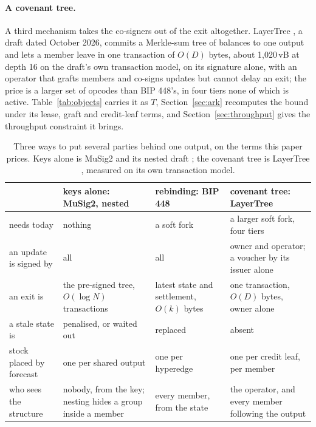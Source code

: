 \documentclass[11pt]{article}
\theoremstyle{plain}
\theoremstyle{definition}
\theoremstyle{remark}
\begin{document}
\paragraph{A covenant tree.} A third mechanism takes the co-signers out of the exit altogether. LayerTree \citep{osuntokun2026layertree}, a draft dated October 2026, commits a Merkle-sum tree of balances to one output and lets a member leave in one transaction of $O(D)$ bytes, about 1{,}020\,vB at depth 16 on the draft's own transaction model, on its signature alone, with an operator that grafts members and co-signs updates but cannot delay an exit; the price is a larger set of opcodes than BIP 448's, in four tiers none of which is active. Table~\ref{tab:objects} carries it as $T$, Section~\ref{sec:ark} recomputes the bound under its lease, graft and credit-leaf terms, and Section~\ref{sec:throughput} gives the throughput constraint it brings.

\begin{table}[t]
\centering
\footnotesize
\setlength{\tabcolsep}{4pt}
\begin{tabular}{@{}>{\raggedright\arraybackslash}p{2.9cm}>{\raggedright\arraybackslash}p{3.6cm}>{\raggedright\arraybackslash}p{3.4cm}>{\raggedright\arraybackslash}p{3.7cm}@{}}
\toprule
 & keys alone: MuSig2, nested & rebinding: BIP 448 & covenant tree: LayerTree \\
\midrule
needs today & nothing & a soft fork & a larger soft fork, four tiers \\
an update is signed by & all & all & owner and operator; a voucher by its issuer alone \\
an exit is & the pre-signed tree, $O(\log N)$ transactions & latest state and settlement, $O(k)$ bytes & one transaction, $O(D)$ bytes, owner alone \\
a stale state is & penalised, or waited out & replaced & absent \\
stock placed by forecast & one per shared output & one per hyperedge & one per credit leaf, per member \\
who sees the structure & nobody, from the key; nesting hides a group inside a member & every member, from the state & the operator, and every member following the output \\
\bottomrule
\end{tabular}
\caption{Three ways to put several parties behind one output, on the terms this paper prices. Keys alone is MuSig2 \citep{bip327} and its nested draft \citep{bip2297}; the covenant tree is LayerTree \citep{osuntokun2026layertree}, measured on its own transaction model.}
\label{tab:mechanisms}
\end{table}
\end{document}
